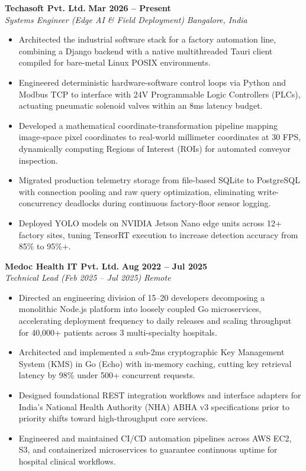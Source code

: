 \documentclass[10pt,a4paper]{article}
\begin{document}
\textbf{Techasoft Pvt. Ltd.} \hfill \textbf{Mar 2026 – Present} \\
\textit{Systems Engineer (Edge AI \& Field Deployment)} \hfill \textit{Bangalore, India}
\begin{itemize}
  \item Architected the industrial software stack for a factory automation line, combining a Django backend with a native multithreaded Tauri client compiled for bare-metal Linux POSIX environments.
  \item Engineered deterministic hardware-software control loops via Python and Modbus TCP to interface with 24V Programmable Logic Controllers (PLCs), actuating pneumatic solenoid valves within an 8ms latency budget.
  \item Developed a mathematical coordinate-transformation pipeline mapping image-space pixel coordinates to real-world millimeter coordinates at 30 FPS, dynamically computing Regions of Interest (ROIs) for automated conveyor inspection.
  \item Migrated production telemetry storage from file-based SQLite to PostgreSQL with connection pooling and raw query optimization, eliminating write-concurrency deadlocks during continuous factory-floor sensor logging.
  \item Deployed YOLO models on NVIDIA Jetson Nano edge units across 12+ factory sites, tuning TensorRT execution to increase detection accuracy from 85\% to 95\%+.
\end{itemize}

\vspace{4pt}
\textbf{Medoc Health IT Pvt. Ltd.} \hfill \textbf{Aug 2022 – Jul 2025} \\
\textit{Technical Lead (Feb 2025 – Jul 2025)} \hfill \textit{Remote}
\begin{itemize}
  \item Directed an engineering division of 15--20 developers decomposing a monolithic Node.js platform into loosely coupled Go microservices, accelerating deployment frequency to daily releases and scaling throughput for 40,000+ patients across 3 multi-specialty hospitals.
  \item Architected and implemented a sub-2ms cryptographic Key Management System (KMS) in Go (Echo) with in-memory caching, cutting key retrieval latency by 98\% under 500+ concurrent requests.
  \item Designed foundational REST integration workflows and interface adapters for India's National Health Authority (NHA) ABHA v3 specifications prior to priority shifts toward high-throughput core services.
  \item Engineered and maintained CI/CD automation pipelines across AWS EC2, S3, and containerized microservices to guarantee continuous uptime for hospital clinical workflows.
\end{itemize}
\end{document}
